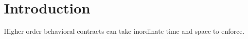\documentclass{sigplanconf}
\begin{document}




% 

\setspecialsymbol{->}{$\rightarrow$}




\section{Introduction}

Higher-order behavioral contracts can take inordinate time and space to enforce.


\end{document}
